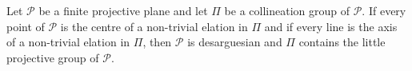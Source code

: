 Let $\mathcal{P}$ be a finite projective plane and let $\Pi$ be a collineation group of $\mathcal{P}$. If every point of $\mathcal{P}$ is the centre of a non-trivial elation in $\Pi$ and if every line is the axis of a non-trivial elation in $\Pi$, then $\mathcal{P}$ is desarguesian and $\Pi$ contains the little projective group of $\mathcal{P}$.
